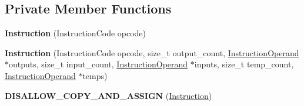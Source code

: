 \subsection*{Private Member Functions}
\begin{DoxyCompactItemize}
\item 
{\bfseries Instruction} (Instruction\+Code opcode)\hypertarget{classv8_1_1internal_1_1compiler_1_1_instruction_a7682c82422010f10d48d97b026c52a91}{}\label{classv8_1_1internal_1_1compiler_1_1_instruction_a7682c82422010f10d48d97b026c52a91}

\item 
{\bfseries Instruction} (Instruction\+Code opcode, size\+\_\+t output\+\_\+count, \hyperlink{classv8_1_1internal_1_1compiler_1_1_instruction_operand}{Instruction\+Operand} $\ast$outputs, size\+\_\+t input\+\_\+count, \hyperlink{classv8_1_1internal_1_1compiler_1_1_instruction_operand}{Instruction\+Operand} $\ast$inputs, size\+\_\+t temp\+\_\+count, \hyperlink{classv8_1_1internal_1_1compiler_1_1_instruction_operand}{Instruction\+Operand} $\ast$temps)\hypertarget{classv8_1_1internal_1_1compiler_1_1_instruction_a9ea91de3a03656f97fdd176e484a78c7}{}\label{classv8_1_1internal_1_1compiler_1_1_instruction_a9ea91de3a03656f97fdd176e484a78c7}

\item 
{\bfseries D\+I\+S\+A\+L\+L\+O\+W\+\_\+\+C\+O\+P\+Y\+\_\+\+A\+N\+D\+\_\+\+A\+S\+S\+I\+GN} (\hyperlink{classv8_1_1internal_1_1compiler_1_1_instruction}{Instruction})\hypertarget{classv8_1_1internal_1_1compiler_1_1_instruction_a39c4390fa1a823f32906e78ae69c7f5c}{}\label{classv8_1_1internal_1_1compiler_1_1_instruction_a39c4390fa1a823f32906e78ae69c7f5c}

\end{DoxyCompactItemize}
